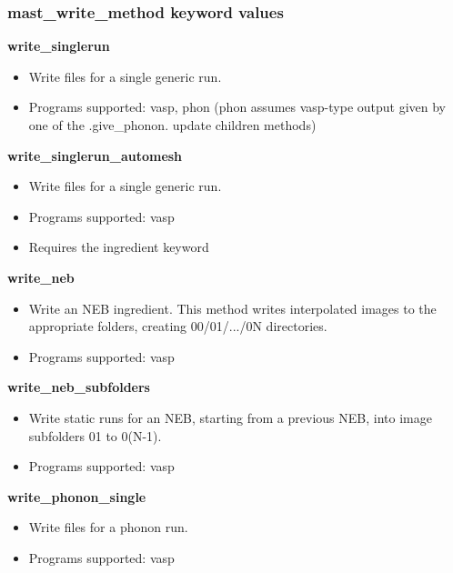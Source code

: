 \documentclass[letterpaper,10pt,english]{sphinxmanual}
\begin{document}
\subsubsection{mast\_write\_method keyword values}
\label{3_0_inputfile:mast-write-method-keyword-values}
\textbf{write\_singlerun}
\begin{itemize}
\item {} 
Write files for a single generic run.

\item {} 
Programs supported: vasp, phon (phon assumes vasp-type output given by one of the .give\_phonon. update children methods)

\end{itemize}

\textbf{write\_singlerun\_automesh}
\begin{itemize}
\item {} 
Write files for a single generic run.

\item {} 
Programs supported: vasp

\item {} 
Requires the  ingredient keyword

\end{itemize}

\textbf{write\_neb}
\begin{itemize}
\item {} 
Write an NEB ingredient. This method writes interpolated images to the appropriate folders, creating 00/01/.../0N directories.

\item {} 
Programs supported: vasp

\end{itemize}

\textbf{write\_neb\_subfolders}
\begin{itemize}
\item {} 
Write static runs for an NEB, starting from a previous NEB, into image subfolders 01 to 0(N-1).

\item {} 
Programs supported: vasp

\end{itemize}

\textbf{write\_phonon\_single}
\begin{itemize}
\item {} 
Write files for a phonon run.

\item {} 
Programs supported: vasp

\end{itemize}
\end{document}
